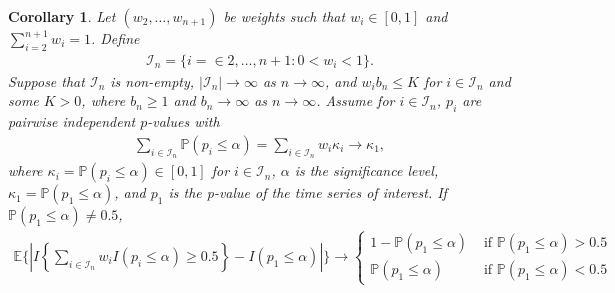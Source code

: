 \documentclass[11pt]{article}
\def\mc#1{\mathcal{#1}} %
\def\E{\mathbb{E}} %
\def\mc#1{\mathcal{#1}}
\def\P{\mathbb{P}}
\newtheorem{corollary}{Corollary}
\theoremstyle{definition}
\begin{document}
\begin{corollary}
\label{coro1}Let $(w_2, \ldots, w_{n+1})$ be weights such that $w_i \in [0,1]$ and $\sum_{i=2}^{n+1} w_i=1$. Define
\begin{align*}
  \mc{I}_n = \{i = \in 2,\ldots, n+1\colon 0< w_i < 1\}.
\end{align*}
Suppose that  $\mc{I}_n$  is non-empty, $|\mc{I}_n| \to \infty$ as $n \to \infty$, and $w_i b_n\leq K$ for $i\in \mc{I}_n$ and some $K>0$, where $b_n \geq 1$ and $b_n \to \infty$ as $n\to \infty$. Assume for $i \in \mc{I}_n$,  $p_i$ are pairwise independent $p$-values  with 
\begin{align*}
  \sum_{i\in \mc{I}_n}\P(p_i \leq \alpha) = \sum_{i\in \mc{I}_n} w_i \kappa_i \to \kappa_{1},
\end{align*}
where $\kappa_i =  \P(p_i \leq \alpha)\in [0,1]$ for $i \in \mc{I}_n$, $\alpha$ is the significance level, $\kappa_1 = \P(p_1 \leq \alpha)$, and  $p_1$ is the p-value of the time series of interest. If $\P(p_1 \leq \alpha) \neq 0.5$,
\begin{align*}
  \E \bigg\{\left|I\left\{ \sum_{i\in \mc{I}_n} w_i I(p_i \leq  \alpha) \geq 0.5\right\}
  - I( p_1 \leq  \alpha) \right|\bigg\}
  \to  \begin{cases}
    1- \P(p_1 \leq \alpha) & \text{ if } \P(p_1 \leq \alpha) > 0.5 \\
    \P(p_1 \leq \alpha) & \text{ if } \P(p_1 \leq \alpha) < 0.5 
  \end{cases}
\end{align*}
\end{corollary}
\end{document}
